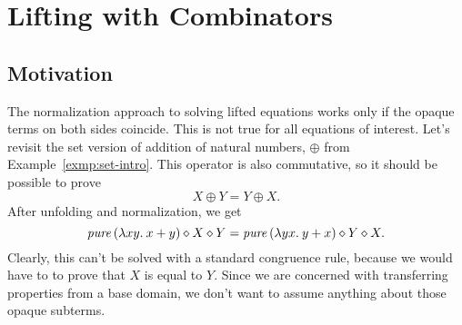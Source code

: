 \chapter{Lifting with Combinators}\label{sec:combinators}

\section{Motivation}\label{subsec:combinator-motivation}

The normalization approach to solving lifted equations works only if the
opaque terms on both sides coincide.
This is not true for all equations of interest.
Let's revisit the set version of addition of natural numbers, $\oplus$ from
Example~\ref{exmp:set-intro}.
This operator is also commutative, so it should be possible to prove
\[ X \oplus Y = Y \oplus X. \]
After unfolding and normalization, we get
\begin{equation}\label{eq:comb-intro1}
	\operatorname{\mathit{pure}}{(\lambda xy.\>x + y)} \diamond X \diamond Y = \operatorname{\mathit{pure}}{(\lambda yx.\>y + x)} \diamond Y \diamond X.
\end{equation}
Clearly, this can't be solved with a standard congruence rule, because we would
have to to prove that $X$ is equal to $Y$.
Since we are concerned with transferring properties from a base domain,
we don't want to assume anything about those opaque subterms.

